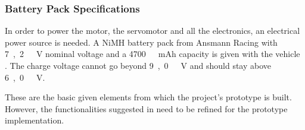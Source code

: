 \subsubsection{Battery Pack Specifications} \label{sssec:BatterySpecs}
In order to power the motor, the servomotor and all the electronics, an electrical power source is needed. A NiMH battery pack from Ansmann Racing with \si{7,2\ V} nominal voltage and a \si{4700\ mAh} capacity is given with the vehicle \cite{BatteryDS}. The charge voltage cannot go beyond \si{9,0\ V} and should stay above \si{6,0\ V}.

These are the basic given elements from which the project's prototype is built. However, the functionalities suggested in  need to be refined for the prototype implementation.